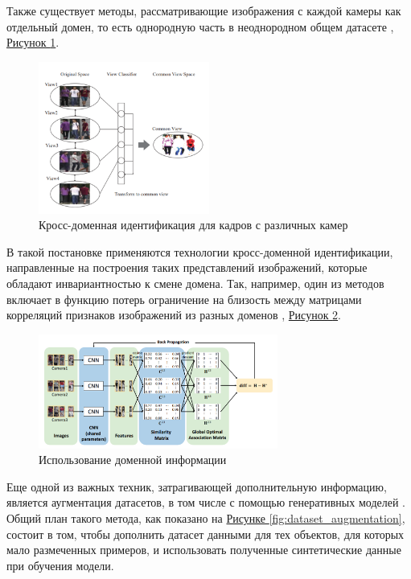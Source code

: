  Также существует методы, рассматривающие изображения с каждой камеры как отдельный домен, то есть однородную часть в неоднородном общем датасете \cite{liu2019view}, \hyperref[fig:viewpoint_information]{Рисунок \ref*{fig:viewpoint_information}}.

 \begin{figure}[ht]
     \centering
     \includegraphics[width=0.5\textwidth]{images/closed_world/viewpoint_information.png}
     \caption{Кросс-доменная идентификация для кадров с различных камер \cite{liu2019view}}
     \label{fig:viewpoint_information}
 \end{figure}

 В такой постановке применяются технологии кросс-доменной идентификации, направленные на построения таких представлений изображений, которые обладают инвариантностью к смене домена. Так, например, один из методов включает в функцию потерь ограничение на близость между матрицами корреляций признаков изображений из разных доменов \cite{lin2017consistent}, \hyperref[fig:domain_information]{Рисунок \ref*{fig:domain_information}}.

 \begin{figure}[ht]
     \centering
     \includegraphics[width=0.7\textwidth]{images/closed_world/domain_information.png}
     \caption{Использование доменной информации \cite{lin2017consistent}}
     \label{fig:domain_information}
 \end{figure}

 Еще одной из важных техник, затрагивающей дополнительную информацию, является аугментация датасетов, в том числе с помощью генеративных моделей \cite{zheng2017unlabeled}. Общий план такого метода, как показано на \hyperref[fig:dataset_augmentation]{Рисунке \ref*{fig:dataset_augmentation}}, состоит в том, чтобы дополнить датасет данными для тех объектов, для которых мало размеченных примеров, и использовать полученные синтетические данные при обучения модели.

